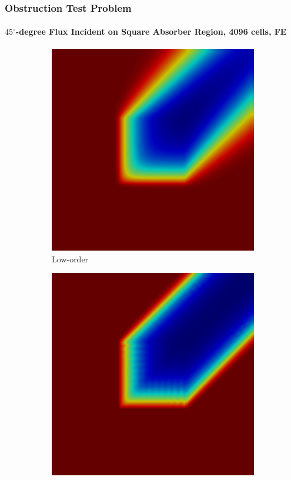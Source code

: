 \begin{frame}
\frametitle{Obstruction Test Problem}
\framesubtitle{$45^\circ$-degree Flux Incident on Square Absorber Region, 4096 cells, FE}

\begin{figure}[h]
   \centering
   \begin{subfigure}{0.49\textwidth}
      \centering
      \includegraphics[width=\textwidth]{./figures/obstruction_Low_FE.png}
      \caption{Low-order}
   \end{subfigure}
   \begin{subfigure}{0.49\textwidth}
      \centering
      \includegraphics[width=\textwidth]{./figures/obstruction_EVFCT_FE.png}

\end{subfigure}
\end{figure}
\end{frame}
